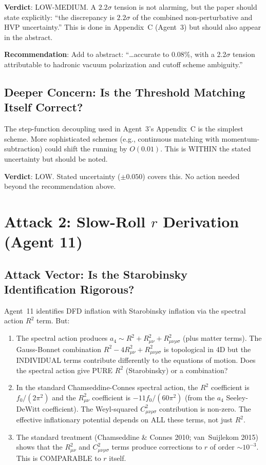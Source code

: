 \documentclass[11pt,a4paper]{article}
\begin{document}
\textbf{Verdict}: LOW-MEDIUM. A $2.2\sigma$ tension is not alarming, but the paper should state explicitly: ``the discrepancy is $2.2\sigma$ of the combined non-perturbative and HVP uncertainty.'' This is done in Appendix~C (Agent~3) but should also appear in the abstract.

\textbf{Recommendation}: Add to abstract: ``\ldots accurate to 0.08\%, with a 2.2$\sigma$ tension attributable to hadronic vacuum polarization and cutoff scheme ambiguity.''

\subsection{Deeper Concern: Is the Threshold Matching Itself Correct?}

The step-function decoupling used in Agent~3's Appendix~C is the simplest scheme. More sophisticated schemes (e.g., continuous matching with momentum-subtraction) could shift the running by $O(0.01)$. This is WITHIN the stated uncertainty but should be noted.

\textbf{Verdict}: LOW. Stated uncertainty ($\pm 0.050$) covers this. No action needed beyond the recommendation above.

\section{Attack 2: Slow-Roll $r$ Derivation (Agent 11)}

\subsection{Attack Vector: Is the Starobinsky Identification Rigorous?}

Agent~11 identifies DFD inflation with Starobinsky inflation via the spectral action $R^2$ term. But:

\begin{enumerate}
\item The spectral action produces $a_4 \sim R^2 + R_{\mu\nu}^2 + R_{\mu\nu\rho\sigma}^2$ (plus matter terms). The Gauss-Bonnet combination $R^2 - 4R_{\mu\nu}^2 + R_{\mu\nu\rho\sigma}^2$ is topological in 4D but the INDIVIDUAL terms contribute differently to the equations of motion. Does the spectral action give PURE $R^2$ (Starobinsky) or a combination?

\item In the standard Chamseddine-Connes spectral action, the $R^2$ coefficient is $f_0/(2\pi^2)$ and the $R_{\mu\nu}^2$ coefficient is $-11f_0/(60\pi^2)$ (from the $a_4$ Seeley-DeWitt coefficient). The Weyl-squared $C_{\mu\nu\rho\sigma}^2$ contribution is non-zero. The effective inflationary potential depends on ALL these terms, not just $R^2$.

\item The standard treatment (Chamseddine \& Connes 2010; van~Suijlekom 2015) shows that the $R_{\mu\nu}^2$ and $C_{\mu\nu\rho\sigma}^2$ terms produce corrections to $r$ of order $\sim 10^{-3}$. This is COMPARABLE to $r$ itself.
\end{enumerate}
\end{document}
